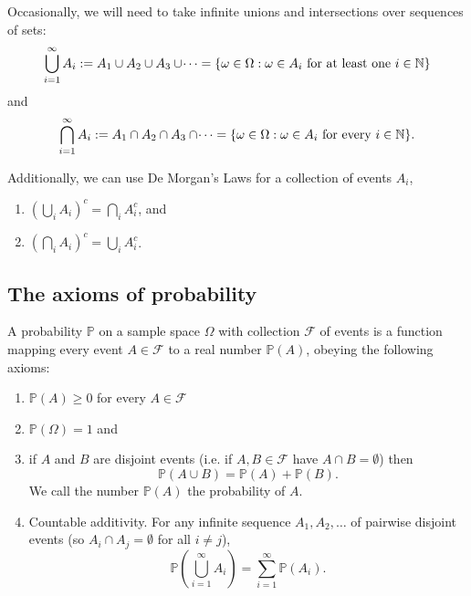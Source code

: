 \documentclass[10pt, a4paper]{article}
\begin{document}
Occasionally, we will need to take infinite unions and intersections over sequences of sets:
\[
\bigcup_{i = 1}^{\infty}{A_i} := A_1 \cup A_2 \cup A_3 \cup \dotsi = \{\omega \in \Omega : \omega \in A_i \text{ for at least one } i \in \mathbb{N}\}
\]
and
\[
\bigcap_{i = 1}^{\infty}{A_i} := A_1 \cap A_2 \cap A_3 \cap \dotsi = \{\omega \in \Omega : \omega \in A_i \text{ for every } i \in \mathbb{N}\}.
\]

Additionally, we can use De Morgan's Laws for a collection of events $A_i$,
\begin{enumerate}[label = (\alph*)]
    \item $\left(\bigcup_i A_i\right) ^ c = \bigcap_i A_i ^ c$, and
    \item $\left(\bigcap_i A_i\right) ^ c = \bigcup_i A_i ^ c$.
\end{enumerate}

\subsection{The axioms of probability}

\begin{definition}[Probability]
    A probability $\mathbb{P}$ on a sample space $\Omega$ with collection $\mathcal{F}$ of events is a function mapping every event $A \in \mathcal{F}$ to a real number $\mathbb{P}(A)$, obeying the following axioms:
    \begin{enumerate}[label = A\arabic*]
        \item $\mathbb{P}(A) \geq 0$ for every $A \in \mathcal{F}$
        \item $\mathbb{P}(\Omega) = 1$ and
        \item if $A$ and $B$ are disjoint events (i.e. if $A, B \in \mathcal{F}$ have $A \cap B = \emptyset$) then
        \[
        \mathbb{P}(A \cup B) = \mathbb{P}(A) + \mathbb{P}(B).
        \]
        We call the number $\mathbb{P}(A)$ the probability of $A$.
        \item Countable additivity. For any infinite sequence $A_1, A_2, \dots$ of pairwise disjoint events (so $A_i \cap A_j = \emptyset$ for all $i \neq j$),
        \[
        \mathbb{P}\left(\bigcup_{i = 1}^{\infty}A_i\right) = \sum_{i = 1}^{\infty}\mathbb{P}(A_i).
        \]
    \end{enumerate}
\end{definition}
\end{document}
